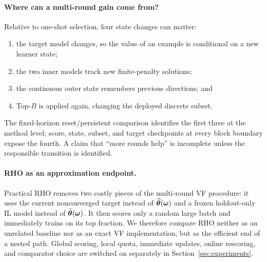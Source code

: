 \paragraph{Where can a multi-round gain come from?}
Relative to one-shot selection, four state changes can matter:
\begin{enumerate}
    \item the target model changes, so the value of an example is conditional
    on a new learner state;
    \item the two inner models track new finite-penalty solutions;
    \item the continuous outer state remembers previous directions; and
    \item Top-$B$ is applied again, changing the deployed discrete subset.
\end{enumerate}
The fixed-horizon reset/persistent comparison identifies the first three at
the method level; score, state, subset, and target checkpoints at every block
boundary expose the fourth. A claim that ``more rounds help'' is incomplete
unless the responsible transition is identified.

\paragraph{RHO as an approximation endpoint.}
Practical RHO removes two costly pieces of the multi-round VF procedure: it
uses the current nonconverged target instead of $\widehat{{\bm{\theta}}}({\bm{\omega}})$ and a
frozen holdout-only IL model instead of
$\widetilde{{\bm{\theta}}}({\bm{\omega}})$. It then scores only a random large batch and
immediately trains on its top fraction. We therefore compare RHO neither as an
unrelated baseline nor as an exact VF implementation, but as the efficient end
of a nested path. Global scoring, local quota, immediate updates, online
rescoring, and comparator choice are switched on separately in
Section~\ref{sec:experiments}.
